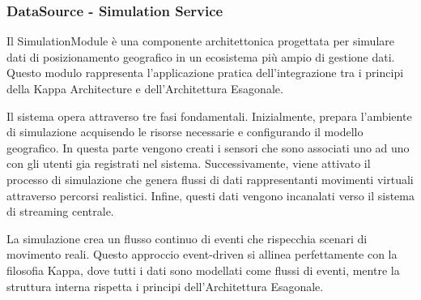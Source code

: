 \documentclass[10pt]{article}
\newcommand{\myparagraph}[1]{\paragraph{#1}\mbox{}\\}
\newcommand{\mysubparagraph}[1]{\subparagraph{#1}\mbox{}\\}
\begin{document}
        \subsubsection{DataSource - Simulation Service}
        Il SimulationModule è una componente architettonica progettata per simulare dati di posizionamento geografico in un ecosistema più ampio di gestione dati. Questo modulo rappresenta l'applicazione pratica dell'integrazione tra i principi della Kappa Architecture e dell'Architettura Esagonale.

        
        Il sistema opera attraverso tre fasi fondamentali. Inizialmente, prepara l'ambiente di simulazione acquisendo le risorse necessarie e configurando il modello geografico. In questa parte vengono creati i sensori che sono associati uno ad uno con gli utenti gia registrati nel sistema. Successivamente, viene attivato il processo di simulazione che genera flussi di dati rappresentanti movimenti virtuali attraverso percorsi realistici. Infine, questi dati vengono incanalati verso il sistema di streaming centrale.

        La simulazione crea un flusso continuo di eventi che rispecchia scenari di movimento reali. Questo approccio event-driven si allinea perfettamente con la filosofia Kappa, dove tutti i dati sono modellati come flussi di eventi, mentre la struttura interna rispetta i principi dell'Architettura Esagonale.




\end{document}
